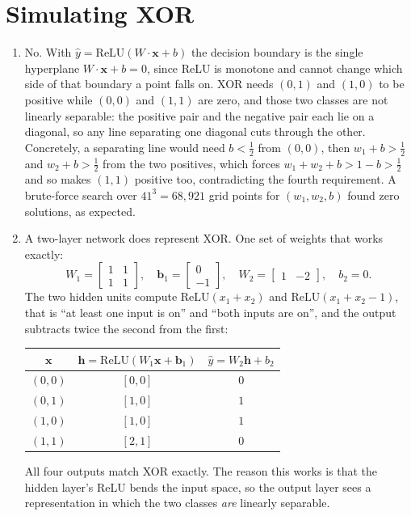 \documentclass[11pt]{article}
\begin{document}
\section{Simulating XOR}

\begin{enumerate}
  \item No. With $\hat{y} = \mathrm{ReLU}(W \cdot \mathbf{x} + b)$ the decision boundary is the single
        hyperplane $W \cdot \mathbf{x} + b = 0$, since ReLU is monotone and cannot change which side of
        that boundary a point falls on. XOR needs $(0,1)$ and $(1,0)$ to be positive while $(0,0)$ and
        $(1,1)$ are zero, and those two classes are not linearly separable: the positive pair and the
        negative pair each lie on a diagonal, so any line separating one diagonal cuts through the other.
        Concretely, a separating line would need $b < \tfrac{1}{2}$ from $(0,0)$, then
        $w_1 + b > \tfrac{1}{2}$ and $w_2 + b > \tfrac{1}{2}$ from the two positives, which forces
        $w_1 + w_2 + b > 1 - b > \tfrac{1}{2}$ and so makes $(1,1)$ positive too, contradicting the fourth
        requirement. A brute-force search over $41^3 = 68{,}921$ grid points for $(w_1, w_2, b)$ found zero
        solutions, as expected.

  \item A two-layer network does represent XOR. One set of weights that works exactly:
        \[
          W_1 = \begin{bmatrix} 1 & 1 \\ 1 & 1 \end{bmatrix}, \quad
          \mathbf{b}_1 = \begin{bmatrix} 0 \\ -1 \end{bmatrix}, \quad
          W_2 = \begin{bmatrix} 1 & -2 \end{bmatrix}, \quad
          b_2 = 0 .
        \]
        The two hidden units compute $\mathrm{ReLU}(x_1 + x_2)$ and $\mathrm{ReLU}(x_1 + x_2 - 1)$, that is
        ``at least one input is on'' and ``both inputs are on'', and the output subtracts twice the second
        from the first:
        \begin{center}
        \begin{tabular}{|c|c|c|}
          \hline
          $\mathbf{x}$ & $\mathbf{h} = \mathrm{ReLU}(W_1\mathbf{x} + \mathbf{b}_1)$ & $\hat{y} = W_2\mathbf{h} + b_2$ \\
          \hline
          $(0,0)$ & $[0, 0]$ & $0$ \\
          $(0,1)$ & $[1, 0]$ & $1$ \\
          $(1,0)$ & $[1, 0]$ & $1$ \\
          $(1,1)$ & $[2, 1]$ & $0$ \\
          \hline
        \end{tabular}
        \end{center}
        All four outputs match XOR exactly. The reason this works is that the hidden layer's ReLU bends
        the input space, so the output layer sees a representation in which the two classes \emph{are}
        linearly separable.


\end{enumerate}
\end{document}
